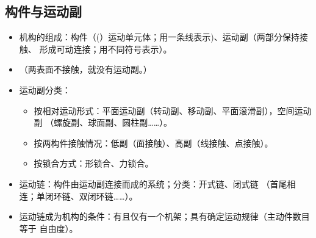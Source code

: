 \documentclass[12pt,a4paper]{article}
\newcommand{\tightlist}{\setlength{\parskip}{0pt}\setlength{\itemsep}{0pt}}
\newcommand{\hint}[1]{\textsf{（#1）}}
\newcommand{\minor}[1]{{\color{gray} #1}}
\begin{document}
\subsection{构件与运动副}
\begin{itemize}\tightlist
    \item 机构的组成：构件\hint(运动单元体；用一条线表示)、运动副\hint{两部分保持接触、
    形成可动连接；用不同符号表示}。
    \item \hint{两表面不接触，就没有运动副。}
    \item 运动副分类：
    \begin{itemize}\tightlist
        \item 按相对运动形式：平面运动副\hint{转动副、移动副、平面滚滑副}，空间运动副
        \minor{\hint{螺旋副、球面副、圆柱副……}}。
        \item 按两构件接触情况：低副\hint{面接触}、高副\hint{线接触、点接触}。
        \item 按锁合方式：形锁合、力锁合。
    \end{itemize}
    \item 运动链：构件由运动副连接而成的系统；分类：开式链、闭式链
    \hint{首尾相连；单闭环链、双闭环链……}。
    \item 运动链成为机构的条件：有且仅有一个机架；具有确定运动规律\hint{主动件数目等于
    自由度}。
\end{itemize}
\end{document}
